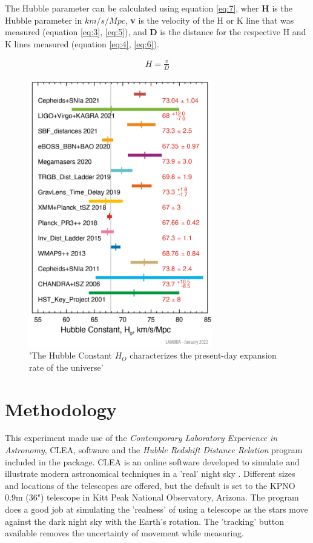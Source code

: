 \documentclass[12pt]{article}
\begin{document}
The Hubble parameter can be calculated using equation \ref{eq:7}, wher \textbf{H} is the Hubble parameter in $km/s/Mpc$, \textbf{v} is the velocity
of the H or K line that was measured (equation \ref{eq:3}, \ref{eq:5}), and \textbf{D} is the distance for the respective H and K lines measured (equation \ref{eq:4}, \ref{eq:6}).

\begin{gather} \label{eq:7}
    H = \frac{v}{D}
\end{gather}

\begin{figure}[H]
    \centering
    \includegraphics[width=8cm]{hubble constant nasa.png}
    \caption{\centering \footnotesize{'The Hubble Constant $H_O$ characterizes the present-day expansion rate of the universe' \protect\cite{nasahubble}}}
    \label{fig:hubble}
\end{figure}

\section{Methodology} 

This experiment made use of the \textit{Contemporary Laboratory Experience in Astronomy}, CLEA, software and the \textit{Hubble Redshift Distance Relation} program included in the package.
CLEA is an online software developed to simulate and illustrate modern astronomical techniques in a 'real' night sky
\cite{clea}.
Different sizes and locations of the telescopes are offered, but the default is set to the KPNO 0.9m (36") telescope in Kitt Peak National Observatory, Arizona.
The program does a good job at simulating the 'realness' of using a telescope as the stars move against the dark night sky with the Earth's rotation. The 'tracking'
button available removes the uncertainty of movement while measuring.
\end{document}

